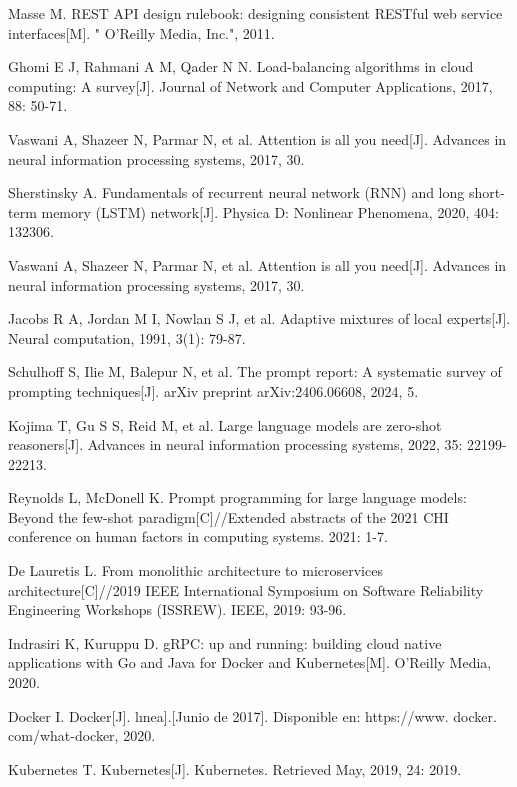 \documentclass[UTF8,a4paper,12pt]{ctexart}
\numberwithin{equation}{section}
\begin{document}
\begin{thebibliography}{1}
 Masse M. REST API design rulebook: designing consistent RESTful web service interfaces[M]. " O'Reilly Media, Inc.", 2011.

 Ghomi E J, Rahmani A M, Qader N N. Load-balancing algorithms in cloud computing: A survey[J]. Journal of Network and Computer Applications, 2017, 88: 50-71.

 Vaswani A, Shazeer N, Parmar N, et al. Attention is all you need[J]. Advances in neural information processing systems, 2017, 30.

 Sherstinsky A. Fundamentals of recurrent neural network (RNN) and long short-term memory (LSTM) network[J]. Physica D: Nonlinear Phenomena, 2020, 404: 132306.

 Vaswani A, Shazeer N, Parmar N, et al. Attention is all you need[J]. Advances in neural information processing systems, 2017, 30.


 Jacobs R A, Jordan M I, Nowlan S J, et al. Adaptive mixtures of local experts[J]. Neural computation, 1991, 3(1): 79-87.

  Schulhoff S, Ilie M, Balepur N, et al. The prompt report: A systematic survey of prompting techniques[J]. arXiv preprint arXiv:2406.06608, 2024, 5.

 Kojima T, Gu S S, Reid M, et al. Large language models are zero-shot reasoners[J]. Advances in neural information processing systems, 2022, 35: 22199-22213.

 Reynolds L, McDonell K. Prompt programming for large language models: Beyond the few-shot paradigm[C]//Extended abstracts of the 2021 CHI conference on human factors in computing systems. 2021: 1-7.

  De Lauretis L. From monolithic architecture to microservices architecture[C]//2019 IEEE International Symposium on Software Reliability Engineering Workshops (ISSREW). IEEE, 2019: 93-96.


 Indrasiri K, Kuruppu D. gRPC: up and running: building cloud native applications with Go and Java for Docker and Kubernetes[M]. O'Reilly Media, 2020.

 Docker I. Docker[J]. lınea].[Junio de 2017]. Disponible en: https://www. docker. com/what-docker, 2020.

 Kubernetes T. Kubernetes[J]. Kubernetes. Retrieved May, 2019, 24: 2019.


\end{thebibliography}
\end{document}

